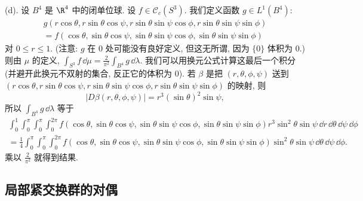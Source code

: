 \begin{solution}
(d). 设 $B^4$ 是 $\R^4$ 中的闭单位球. 设 $f \in \mathcal{C}_c(S^3)$. 我们定义函数 $g \in L^1(B^4)$:
\begin{multline*}
g(r\cos\theta, r\sin\theta\cos\psi, r\sin\theta\sin\psi\cos\phi, r\sin\theta\sin\psi\sin\phi) \\
= f(\cos\theta, \sin\theta\cos\psi, \sin\theta\sin\psi\cos\phi, \sin\theta\sin\psi\sin\phi)
\end{multline*}
对 $0 \leq r \leq 1$. (注意: $g$ 在 $0$ 处可能没有良好定义, 但这无所谓, 因为 $\{0\}$ 体积为 $0$.) 则由 $\mu$ 的定义, $\int_{S^3}f\,\dd\mu = \frac{2}{\pi^2}\int_{B^4}g\,\dd\lambda$. 我们可以用换元公式计算这最后一个积分 (并避开此换元不双射的集合, 反正它的体积为 $0$). 若 $\beta$ 是把 $(r, \theta, \phi, \psi)$ 送到 $(r\cos\theta, r\sin\theta\cos\psi, r\sin\theta\sin\psi\cos\phi, r\sin\theta\sin\psi\sin\phi)$ 的映射, 则
\[
|D\beta(r, \theta, \phi, \psi)| = r^3(\sin\theta)^2\sin\psi,
\]
所以 $\int_{B^4}g\,\dd\lambda$ 等于
\begin{multline*}
\int_0^1\int_0^{\pi}\int_0^{\pi}\int_0^{2\pi}f(\cos\theta, \sin\theta\cos\psi, \sin\theta\sin\psi\cos\phi, \sin\theta\sin\psi\sin\phi)r^3\sin^2\theta\sin\psi\,\dd r\,\dd\theta\,\dd\psi\,\dd\phi \\
= \frac{1}{4}\int_0^{\pi}\int_0^{\pi}\int_0^{2\pi}f(\cos\theta, \sin\theta\cos\psi, \sin\theta\sin\psi\cos\phi, \sin\theta\sin\psi\sin\phi)\sin^2\theta\sin\psi\,\dd\theta\,\dd\psi\,\dd\phi.
\end{multline*}
乘以 $\frac{2}{\pi^2}$ 就得到结果.
\end{solution}

\subsection{局部紧交换群的对偶}

